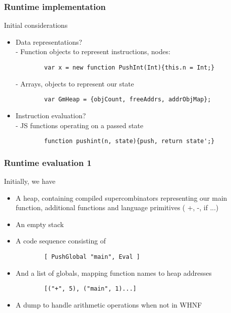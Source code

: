 \documentclass{beamer}
\begin{document}
\begin{frame}[fragile]
	\frametitle{Runtime implementation}
	Initial considerations
	\begin{itemize}
		\item Data representations? \\
		- Function objects to represent
		instructions, nodes: 
		\begin{verbatim}
		var x = new function PushInt(Int){this.n = Int;}
		\end{verbatim}
		- Arrays, objects to represent our state 
		\begin{verbatim}
		var GmHeap = {objCount, freeAddrs, addrObjMap};
		\end{verbatim}
		\item Instruction evaluation? \\
		- JS functions operating on a passed state 
		\begin{verbatim}
		function pushint(n, state){push, return state';}	
		\end{verbatim}
	\end{itemize}
\end{frame}

\begin{frame}[fragile]
	\frametitle{Runtime evaluation 1}
	Initially, we have
	\begin{itemize}
		\item A heap, containing compiled supercombinators
			  representing our main function, additional 
			  functions and language primitives ( +, -, if ...)
		\item An empty stack
		\item A code sequence consisting of
		\begin{verbatim} 
		[ PushGlobal "main", Eval ]
		\end{verbatim} 
		\item And a list of globals, mapping function names
			  to heap addresses
		\begin{verbatim}
		[("+", 5), ("main", 1)...]
		\end{verbatim}
		\item A dump to handle arithmetic operations when not in
		WHNF
	\end{itemize}
\end{frame}
\end{document}
